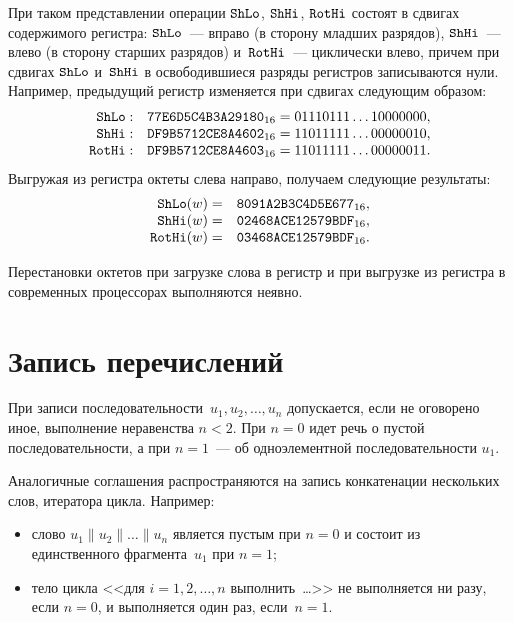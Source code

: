 При таком представлении операции $\mathop{\texttt{ShLo}}\nolimits$, $\mathop{\texttt{ShHi}}\nolimits$, $\mathop{\texttt{RotHi}}\nolimits$ состоят в
сдвигах содержимого регистра: 
$\mathop{\texttt{ShLo}}\nolimits$~--- вправо (в сторону младших разрядов),
$\mathop{\texttt{ShHi}}\nolimits$~--- влево (в сторону старших разрядов)
и~$\mathop{\texttt{RotHi}}\nolimits$~--- циклически влево,
причем при сдвигах $\mathop{\texttt{ShLo}}\nolimits$ и~$\mathop{\texttt{ShHi}}\nolimits$ в освободившиеся разряды 
регистров записываются нули.
%
Например, предыдущий регистр изменяется при сдвигах следующим образом:
$$      
\begin{array}{rl}
\mathop{\texttt{ShLo}}\nolimits: &\texttt{77E6D5C4B3A29180}_{16}
=0 1110111\ldots 1 0000000
,\\
\mathop{\texttt{ShHi}}\nolimits: &\texttt{DF9B5712CE8A4602}_{16}
=1101111 1 \ldots 0000001 0
,\\
\mathop{\texttt{RotHi}}\nolimits: &\texttt{DF9B5712CE8A4603}_{16}
=1101111 1\ldots 0000001 1
.
\end{array}
$$
Выгружая из регистра октеты слева направо, 
получаем следующие результаты:
$$
\begin{array}{rl}
\mathop{\texttt{ShLo}}\nolimits(w)=  &\texttt{8091A2B3C4D5E677}_{16},\\
\mathop{\texttt{ShHi}}\nolimits(w)=  &\texttt{02468ACE12579BDF}_{16},\\
\mathop{\texttt{RotHi}}\nolimits(w)= &\texttt{03468ACE12579BDF}_{16}.
\end{array}
$$

Перестановки октетов при загрузке слова в регистр и при выгрузке из 
регистра в современных процессорах выполняются неявно.

\section{Запись перечислений}\label{DEFS.Seqs}

При записи последовательности~$u_1,u_2,\ldots,u_n$ 
допускается, если не оговорено иное, выполнение неравенства $n<2$.
При $n=0$ идет речь о пустой последовательности, 
а при $n=1$~--- об одноэлементной последовательности $u_1$.

Аналогичные соглашения распространяются на запись конкатенации нескольких 
слов, итератора цикла.
%
Например:
\begin{itemize}
\item
слово $u_1\parallel u_2\parallel\ldots\parallel u_n$ является пустым при $n=0$ 
и состоит из единственного фрагмента~$u_1$ при $n=1$;
\item
тело цикла <<для $i=1,2,\ldots,n$ выполнить~\ldots>>
не выполняется ни разу, если $n=0$, и выполняется один раз, если~$n=1$.
\end{itemize}
